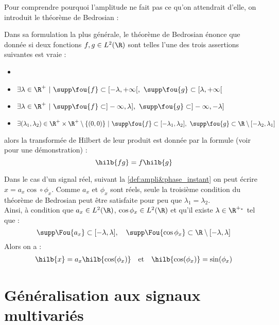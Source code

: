 Pour comprendre pourquoi l'amplitude ne fait pas ce qu'on attendrait d'elle, on introduit le théorème de Bedrosian :

\begin{theoreme}[de Bedrosian]\label{theo:2Bedrosian}
	Dans sa formulation la plus générale, le théorème de Bedrosian énonce que donnée si deux fonctions $f,g\in L^2(\R)$ sont telles l'une des trois assertions suivantes est vraie :
	\begin{itemize}
		\item 
		\item $\exists \lambda\in\R^+\ |\ \supp \fou{f} \subset [-\lambda, +\infty[,\ \supp \fou{g} \subset [\lambda, +\infty[$
		
		\item $\exists \lambda\in\R^+\ |\ \supp \fou{f} \subset ]-\infty, \lambda],\ \supp \fou{g} \subset ]-\infty,-\lambda]$
		
		\item $\exists (\lambda_1,\lambda_2)\in \R^+\times\R^+ \setminus\{(0,0)\}\ |\ \supp \fou{f} \subset [-\lambda_1, \lambda_2],\ \supp \fou{g} \subset \R\setminus[-\lambda_2,\lambda_1]$
	\end{itemize}
	alors la transformée de Hilbert de leur produit est donnée par la formule (voir \cite{wang_simple_2009} pour une démonstration) :
	\begin{equation}\label{eq:2Bedrosian}
		\hilb{fg} = f\hilb{g}
 	\end{equation}
\end{theoreme}
\begin{corollaire}\label{coro:AM-FM}
	Dans le cas d'un signal réel, suivant la \cref{def:ampli&phase_instant} on peut écrire \newline $x=a_x\cos\circ\phi_x$.
	Comme $a_x$ et $\phi_x$ sont réels, seule la troisième condition du théorème de Bedrosian peut être satisfaite pour peu que $\lambda_1=\lambda_2$.
	\\
	Ainsi, à condition que $a_x\in L^2(\R)$, $\cos\phi_x\in L^2(\R)$ et qu'il existe $\lambda\in\R^{+_*}$ tel que :
	\[\supp \Fou{a_x} \subset [-\lambda, \lambda],\quad \supp \Fou{\cos\phi_x} \subset \R\setminus[-\lambda,\lambda]\]
	 Alors on a :
	\begin{align*}
		\hilb{x} &= a_x\hilb{\cos(\phi_x)}  &  &\text{et}  &  \hilb{\cos(\phi_x)} = \sin(\phi_x)
	\end{align*}
\end{corollaire}



\section{Généralisation aux signaux multivariés}\label{sec:sign_multivar}


